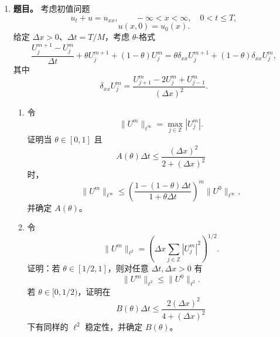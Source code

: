 ﻿\documentclass[UTF8,12pt]{ctexart}
\begin{document}
\begin{enumerate}[label=\textbf{\arabic*.},leftmargin=2.2em]
\textbf{解答。} 令
\[
Y=[y_1,\ldots,y_n]\in\mathbb R^{m\times n},
\qquad
\Phi=[\psi_1,\ldots,\psi_\ell]\in\mathbb R^{m\times\ell},
\]
并要求
\[
\Phi^T\Phi=I_\ell.
\]
对每个 \(y_j\)，\(\sum_i(y_j^T\psi_i)\psi_i=\Phi\Phi^Ty_j\)，所以
\[
J=\|Y-\Phi\Phi^TY\|_F^2.
\]
展开 Frobenius 范数：
\[
\begin{aligned}
J
&=\operatorname{tr}\bigl((Y-\Phi\Phi^TY)^T(Y-\Phi\Phi^TY)\bigr)\\
&=\operatorname{tr}(Y^TY)-\operatorname{tr}(Y^T\Phi\Phi^TY)\\
&=\|Y\|_F^2-\operatorname{tr}(\Phi^TYY^T\Phi).
\end{aligned}
\]
因此最小化 \(J\) 等价于在 \(\Phi^T\Phi=I_\ell\) 下最大化
\[
\operatorname{tr}(\Phi^TC\Phi),
\qquad C=YY^T.
\]
矩阵 \(C\) 是实对称半正定矩阵。由 Ky Fan 最大值原理，最大值由 \(C\) 的前 \(\ell\) 个最大特征值对应的标准正交特征向量取得。因此取
\[
\psi_1,\ldots,\psi_\ell
\]
为 \(YY^T\) 的最大 \(\ell\) 个特征值对应的标准正交特征向量即可。等价地，它们是矩阵 \(Y\) 的前 \(\ell\) 个左奇异向量。这就是主成分分析或 proper orthogonal decomposition 的构造。

\item \textbf{题目。} 考虑初值问题
\[
u_t+u=u_{xx},\qquad -\infty<x<\infty,\quad 0<t\le T,
\]
\[
u(x,0)=u_0(x).
\]
给定 \(\Delta x>0\)、\(\Delta t=T/M\)，考虑 \(\theta\)-格式
\[
\frac{U_j^{m+1}-U_j^m}{\Delta t}
\!+\theta U_j^{m+1}+(1-\theta)U_j^m
=\theta\delta_{xx}U_j^{m+1}+(1-\theta)\delta_{xx}U_j^m,
\]
其中
\[
\delta_{xx}U_j^m
=\frac{U_{j+1}^m-2U_j^m+U_{j-1}^m}{(\Delta x)^2}.
\]
\begin{enumerate}[label=(\alph*),leftmargin=2.0em]
\item 令
\[
\|U^m\|_{\ell^\infty}=\max_{j\in\mathbb Z}|U_j^m|.
\]
证明当 \(\theta\in[0,1]\) 且
\[
A(\theta)\Delta t\le
\frac{(\Delta x)^2}{2+(\Delta x)^2}
\]
时，
\[
\|U^m\|_{\ell^\infty}
\le
\left(\frac{1-(1-\theta)\Delta t}{1+\theta\Delta t}\right)^m
\|U^0\|_{\ell^\infty},
\]
并确定 \(A(\theta)\)。
\item 令
\[
\|U^m\|_{\ell^2}
=\left(\Delta x\sum_{j\in\mathbb Z}|U_j^m|^2\right)^{1/2}.
\]
证明：若 \(\theta\in[1/2,1]\)，则对任意 \(\Delta t,\Delta x>0\) 有
\[
\|U^m\|_{\ell^2}\le\|U^0\|_{\ell^2}.
\]
若 \(\theta\in[0,1/2)\)，证明在
\[
B(\theta)\Delta t\le
\frac{2(\Delta x)^2}{4+(\Delta x)^2}
\]
下有同样的 \(\ell^2\) 稳定性，并确定 \(B(\theta)\)。
\end{enumerate}


\end{enumerate}
\end{document}
